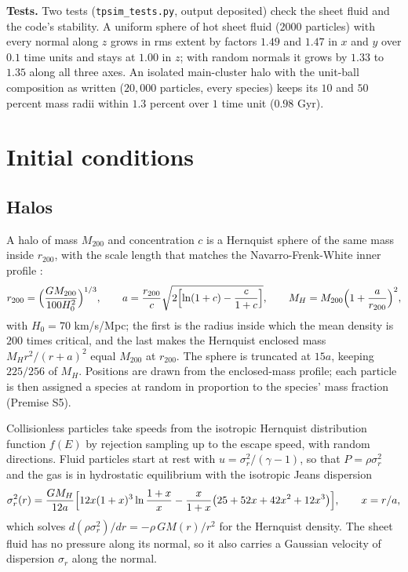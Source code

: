 \documentclass[11pt]{article}
\theoremstyle{definition}
\theoremstyle{plain}
\providecommand{\file}{}\renewcommand{\file}[1]{\texttt{#1}}
\begin{document}
\label{c:note.simulations.setting-time-integration-output-2}
\textbf{Tests.} Two tests (\file{tpsim\_tests.py}, output deposited) check the sheet fluid and the code's stability. A uniform sphere of hot sheet fluid ($2000$ particles) with every normal along $z$ grows in rms extent by factors $1.49$ and $1.47$ in $x$ and $y$ over $0.1$ time units and stays at $1.00$ in $z$; with random normals it grows by $1.33$ to $1.35$ along all three axes. An isolated main-cluster halo with the unit-ball composition as written ($20{,}000$ particles, every species) keeps its $10$ and $50$ percent mass radii within $1.3$ percent over $1$ time unit ($0.98$ Gyr).

\section{Initial conditions}

\subsection*{Halos}
\label{c:note.simulations.setting-halos}
A halo of mass $M_{200}$ and concentration $c$ is a Hernquist sphere of the same mass inside $r_{200}$, with the scale length that matches the Navarro-Frenk-White inner profile \cite{Hernquist1990, NFW1997, SpringelDiMatteoHernquist2005}:
\[
r_{200} = \Bigl(\frac{GM_{200}}{100H_{0}^{2}}\Bigr)^{1/3},\qquad
a = \frac{r_{200}}{c}\sqrt{2\Bigl[\ln(1 + c) - \frac{c}{1 + c}\Bigr]},\qquad
M_{H} = M_{200}\Bigl(1 + \frac{a}{r_{200}}\Bigr)^{2},
\]
with $H_{0} = 70$ km/s/Mpc; the first is the radius inside which the mean density is $200$ times critical, and the last makes the Hernquist enclosed mass $M_{H}r^{2}/(r + a)^{2}$ equal $M_{200}$ at $r_{200}$. The sphere is truncated at $15a$, keeping $225/256$ of $M_{H}$. Positions are drawn from the enclosed-mass profile; each particle is then assigned a species at random in proportion to the species' mass fraction (Premise S5).

Collisionless particles take speeds from the isotropic Hernquist distribution function $f(E)$ \cite{Hernquist1990} by rejection sampling up to the escape speed, with random directions. Fluid particles start at rest with $u = \sigma_{r}^{2}/(\gamma - 1)$, so that $P = \rho\sigma_{r}^{2}$ and the gas is in hydrostatic equilibrium with the isotropic Jeans dispersion
\[
\sigma_{r}^{2}(r) = \frac{GM_{H}}{12a}\Bigl[12x(1 + x)^{3}\ln\frac{1 + x}{x} - \frac{x}{1 + x}\bigl(25 + 52x + 42x^{2} + 12x^{3}\bigr)\Bigr], \qquad x = r/a ,
\]
which solves $d(\rho\sigma_{r}^{2})/dr = -\rho\,GM(r)/r^{2}$ for the Hernquist density. The sheet fluid has no pressure along its normal, so it also carries a Gaussian velocity of dispersion $\sigma_{r}$ along the normal.
\end{document}
